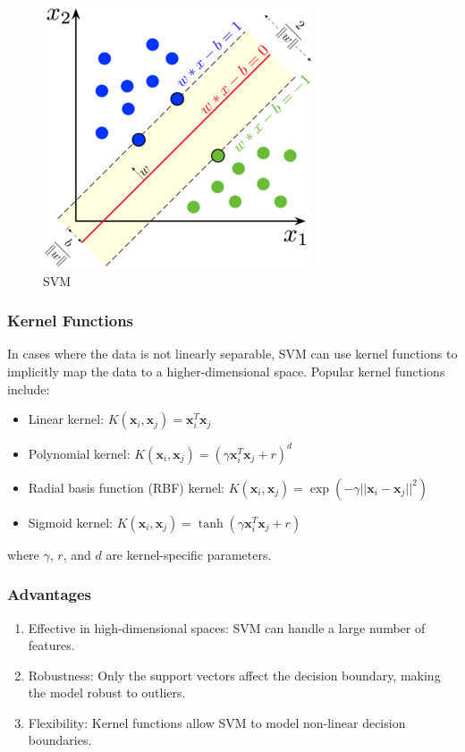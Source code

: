 \documentclass[12pt]{article}
\begin{document}
\begin{figure}[h]
    \centering
    \includegraphics[scale=2.5]{./media/svm.png}
    \caption{SVM}
    \label{fig:svm}
\end{figure}

\subsubsection{Kernel Functions}

In cases where the data is not linearly separable, SVM can use kernel functions to implicitly map the data to a higher-dimensional space. Popular kernel functions include:

\begin{itemize}
\item Linear kernel: $K(\mathbf{x}_i, \mathbf{x}_j) = \mathbf{x}_i^T \mathbf{x}_j$
\item Polynomial kernel: $K(\mathbf{x}_i, \mathbf{x}_j) = (\gamma \mathbf{x}_i^T \mathbf{x}_j + r)^d$
\item Radial basis function (RBF) kernel: $K(\mathbf{x}_i, \mathbf{x}_j) = \exp(-\gamma ||\mathbf{x}_i - \mathbf{x}_j||^2)$
\item Sigmoid kernel: $K(\mathbf{x}_i, \mathbf{x}_j) = \tanh(\gamma \mathbf{x}_i^T \mathbf{x}_j + r)$
\end{itemize}

where $\gamma$, $r$, and $d$ are kernel-specific parameters.

\subsubsection{Advantages}
\begin{enumerate}
\item Effective in high-dimensional spaces: SVM can handle a large number of features.
\item Robustness: Only the support vectors affect the decision boundary, making the model robust to outliers.
\item Flexibility: Kernel functions allow SVM to model non-linear decision boundaries.
\end{enumerate}
\end{document}
